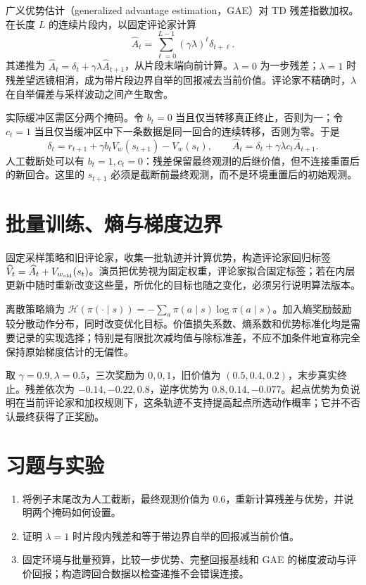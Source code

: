 广义优势估计（generalized advantage estimation，GAE）\cite{schulman-gae}对 TD 残差指数加权。在长度 $L$ 的连续片段内，以固定评论家计算
\[
\widehat A_t=\sum_{\ell=0}^{L-1}(\gamma\lambda)^\ell\delta_{t+\ell}.
\]
其递推为 $\widehat A_t=\delta_t+\gamma\lambda\widehat A_{t+1}$，从片段末端向前计算。$\lambda=0$ 为一步残差；$\lambda=1$ 时残差望远镜相消，成为带片段边界自举的回报减去当前价值。评论家不精确时，$\lambda$ 在自举偏差与采样波动之间产生取舍。

实际缓冲区需区分两个掩码。令 $b_t=0$ 当且仅当转移真正终止，否则为一；令 $c_t=1$ 当且仅当缓冲区中下一条数据是同一回合的连续转移，否则为零。于是
\begin{equation}
\delta_t=r_{t+1}+\gamma b_tV_w(s_{t+1})-V_w(s_t),\qquad
\widehat A_t=\delta_t+\gamma\lambda c_t\widehat A_{t+1}.
\label{eq:rl-gae-masks}
\end{equation}
人工截断处可以有 $b_t=1,c_t=0$：残差保留最终观测的后继价值，但不连接重置后的新回合。这里的 $s_{t+1}$ 必须是截断前最终观测，而不是环境重置后的初始观测。

\section{批量训练、熵与梯度边界}

固定采样策略和旧评论家，收集一批轨迹并计算优势，构造评论家回归标签 $\widehat V_t=\widehat A_t+V_{w_{\rm old}}(s_t)$。演员把优势视为固定权重，评论家拟合固定标签；若在内层更新中随时重新改变这些量，所优化的目标也随之变化，必须另行说明算法版本。

离散策略熵为 $\mathcal H(\pi(\cdot\mid s))=-\sum_a\pi(a\mid s)\log\pi(a\mid s)$。加入熵奖励鼓励较分散动作分布，同时改变优化目标。价值损失系数、熵系数和优势标准化均是需要记录的实现选择；特别是有限批次减均值与除标准差，不应不加条件地宣称完全保持原始梯度估计的无偏性。

\begin{example}[三步 GAE]
取 $\gamma=0.9,\lambda=0.5$，三次奖励为 $0,0,1$，旧价值为 $(0.5,0.4,0.2)$，末步真实终止。残差依次为 $-0.14,-0.22,0.8$，逆序优势为 $0.8,0.14,-0.077$。起点优势为负说明在当前评论家和加权规则下，这条轨迹不支持提高起点所选动作概率；它并不否认最终获得了正奖励。
\end{example}

\section{习题与实验}
\begin{enumerate}
\item 将例子末尾改为人工截断，最终观测价值为 $0.6$，重新计算残差与优势，并说明两个掩码如何设置。
\item 证明 $\lambda=1$ 时片段内残差和等于带边界自举的回报减当前价值。
\item 固定环境与批量预算，比较一步优势、完整回报基线和 GAE 的梯度波动与评价回报；构造跨回合数据以检查递推不会错误连接。
\end{enumerate}





